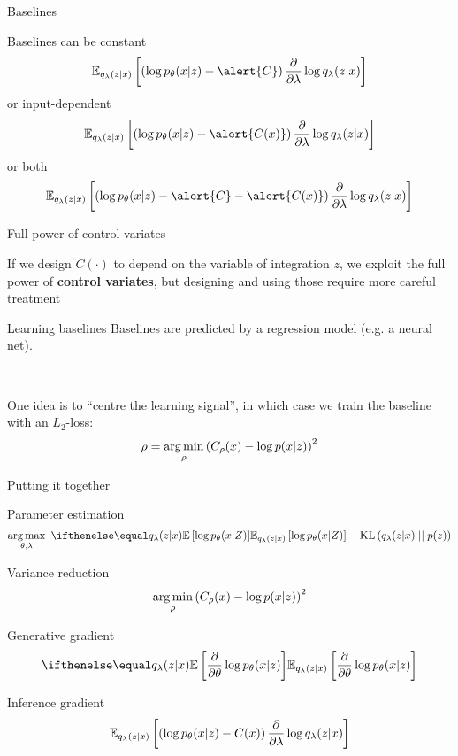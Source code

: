 \begin{frame}{Baselines}

Baselines can be constant
\begin{equation}
\mathbb E_{q_\lambda(z|x)} \left[  \left( \log p_\theta(x|z) - \alert{C} \right)  \pdv{\lambda}\log q_\lambda(z|x) \right]
\end{equation} \pause
or input-dependent
\begin{equation}
\mathbb E_{q_\lambda(z|x)} \left[  \left( \log p_\theta(x|z) - \alert{C(x)} \right)  \pdv{\lambda}\log q_\lambda(z|x) \right]
\end{equation} \pause
or both
\begin{equation}
\mathbb E_{q_\lambda(z|x)} \left[  \left( \log p_\theta(x|z) - \alert{C} - \alert{C(x)} \right)  \pdv{\lambda}\log q_\lambda(z|x) \right]
\end{equation}


\end{frame}


\begin{frame}{Full power of control variates}

If we design $C(\cdot)$ to depend on the variable of integration $z$,  we exploit the full power of {\bf control variates}, but designing and using those require more careful treatment


\end{frame}

\begin{frame}{Learning baselines}
Baselines are predicted by a regression model (e.g. a neural net). 

~

One idea is to ``centre the learning signal'', in which case we train the baseline with an  $ L_{2} $-loss:
\begin{equation*}
\rho = \operatorname*{arg\,min}_{\rho} \left(C_\rho(x) - \log p(x|z)\right)^{2}
\end{equation*}

\end{frame}

\begin{frame}[plain]{Putting it together}

Parameter estimation
\begin{equation*}
\argmax_{\theta,\lambda} ~ \E[q_\lambda(z|x)]{\log p_\theta(x|Z)} - \KL{q_\lambda(z|x)}{p(z)}
\end{equation*}

Variance reduction
$$\operatorname*{arg\,min}_{\rho} \left(C_\rho(x) - \log p(x|z)\right)^{2}$$

Generative gradient
$$\E[q_\lambda(z|x)]{\pdv{\theta}\log p_\theta(x|z)}$$


Inference gradient
$$\mathbb E_{q_\lambda(z|x)} \left[  \left( \log p_\theta(x|z) - C(x) \right)  \pdv{\lambda}\log q_\lambda(z|x) \right]$$

\end{frame}


